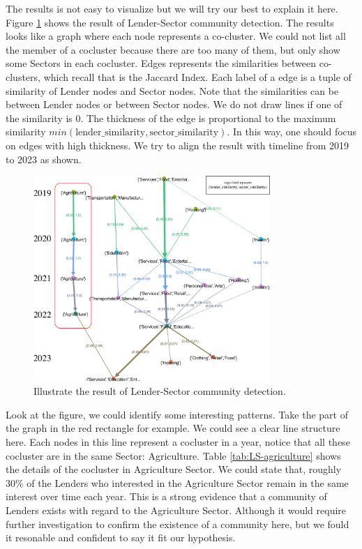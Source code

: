 % 

The results is not easy to visualize but we will try our best to explain it here.
Figure \ref{fig:appendix-LSector} shows the result of Lender-Sector community detection.
The results looks like a graph where each node represents a co-cluster.
We could not list all the member of a cocluster because there are too many of them,
but only show some Sectors in each cocluster.
Edges represents the similarities between co-clusters, which recall that is the Jaccard Index.
Each label of a edge is a tuple of similarity of Lender nodes and Sector nodes.
Note that the similarities can be between Lender nodes or between Sector nodes.
We do not draw lines if one of the similarity is $0$.
The thickness of the edge is proportional to the maximum similarity $min(\text{lender\_similarity}, \text{sector\_similarity})$.
In this way, one should focus on edges with high thickness.
We try to align the result with timeline from 2019 to 2023 as shown.

\begin{figure}[H]
	\centering
	\includegraphics[width=0.8\textwidth]{images/LSector.pdf}
	\caption{Illustrate the result of Lender-Sector community detection.}
	\label{fig:appendix-LSector}
\end{figure}

Look at the figure, we could identify some interesting patterns.
Take the part of the graph in the red rectangle for example.
We could see a clear line structure here.
Each nodes in this line represent a cocluster in a year,
notice that all these cocluster are in the same Sector: Agriculture.
Table \ref{tab:LS-agriculture} shows the details of the cocluster in Agriculture Sector.
We could state that, roughly $30\%$ of the Lenders who interested in the Agriculture Sector
remain in the same interest over time each year.
This is a strong evidence that a community of Lenders exists with regard to the Agriculture Sector.
Although it would require further investigation to confirm the existence of a community here,
but we fould it resonable and confident to say it fit our hypothesis.

